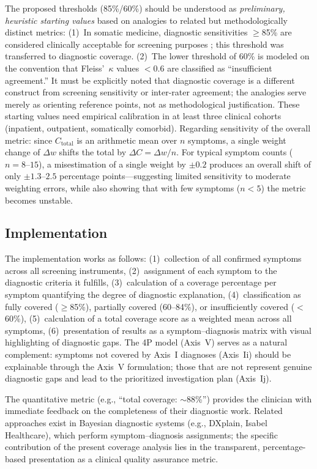 \documentclass[11pt,a4paper]{article}
\begin{document}
The proposed thresholds (85\%/60\%) should be understood as \textit{preliminary, heuristic starting values} based on analogies to related but methodologically distinct metrics: (1)~In somatic medicine, diagnostic sensitivities $\geq$85\% are considered clinically acceptable for screening purposes \citep{Levis2019}; this threshold was transferred to diagnostic coverage. (2)~The lower threshold of 60\% is modeled on the convention that Fleiss'~$\kappa$ values $<$0.6 are classified as ``insufficient agreement.'' It must be explicitly noted that diagnostic coverage is a different construct from screening sensitivity or inter-rater agreement; the analogies serve merely as orienting reference points, not as methodological justification. These starting values need empirical calibration in at least three clinical cohorts (inpatient, outpatient, somatically comorbid). Regarding sensitivity of the overall metric: since $C_{\text{total}}$ is an arithmetic mean over $n$ symptoms, a single weight change of $\Delta w$ shifts the total by $\Delta C = \Delta w / n$. For typical symptom counts ($n = 8$--$15$), a misestimation of a single weight by $\pm 0.2$ produces an overall shift of only $\pm 1.3$--$2.5$ percentage points---suggesting limited sensitivity to moderate weighting errors, while also showing that with few symptoms ($n < 5$) the metric becomes unstable.

\subsection{Implementation}

The implementation works as follows: (1)~collection of all confirmed symptoms across all screening instruments, (2)~assignment of each symptom to the diagnostic criteria it fulfills, (3)~calculation of a coverage percentage per symptom quantifying the degree of diagnostic explanation, (4)~classification as fully covered ($\geq$85\%), partially covered (60--84\%), or insufficiently covered ($<$60\%), (5)~calculation of a total coverage score as a weighted mean across all symptoms, (6)~presentation of results as a symptom--diagnosis matrix with visual highlighting of diagnostic gaps. The 4P model (Axis~V) serves as a natural complement: symptoms not covered by Axis~I diagnoses (Axis~Ii) should be explainable through the Axis~V formulation; those that are not represent genuine diagnostic gaps and lead to the prioritized investigation plan (Axis~Ij).

The quantitative metric (e.g., ``total coverage: $\sim$88\%'') provides the clinician with immediate feedback on the completeness of their diagnostic work. Related approaches exist in Bayesian diagnostic systems (e.g., DXplain, Isabel Healthcare), which perform symptom--diagnosis assignments; the specific contribution of the present coverage analysis lies in the transparent, percentage-based presentation as a clinical quality assurance metric.
\end{document}
